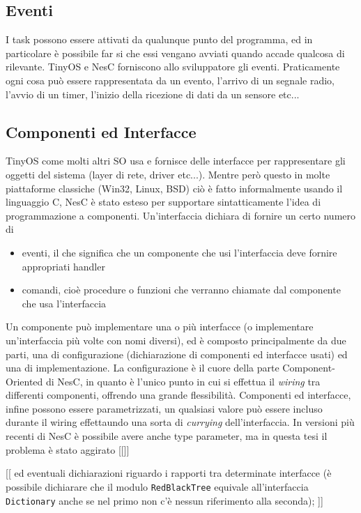\documentclass[pdftex,12pt,a4paper,italian,openany]{book}
\begin{document}
\subsection{Eventi}
I task possono essere attivati da qualunque punto del programma, ed in particolare è possibile 
far si che essi vengano avviati quando accade qualcosa di rilevante. 
TinyOS e NesC forniscono allo sviluppatore gli eventi. Praticamente ogni cosa può essere 
rappresentata da un evento, l'arrivo di un segnale radio, l'avvio di un timer, l'inizio della ricezione di dati da un sensore etc...
 

\subsection{Componenti ed Interfacce}
TinyOS come molti altri SO usa e fornisce delle interfacce per rappresentare gli oggetti del 
sistema (layer di rete, driver etc...). 
Mentre però questo in molte piattaforme classiche (Win32, Linux, BSD) ciò è fatto informalmente 
usando il linguaggio C, NesC è stato esteso per supportare sintatticamente l'idea di 
programmazione a componenti. 
Un'interfaccia dichiara di fornire un certo numero di 
\begin{itemize}

\item{eventi, il che significa che un componente che usi l'interfaccia deve fornire appropriati
handler} 

\item{comandi, cioè procedure o funzioni che verranno chiamate dal componente che usa l'interfaccia}
\end{itemize}

Un componente può implementare una o più interfacce (o implementare un'interfaccia più volte 
con nomi diversi), ed è composto principalmente da due parti, una di configurazione 
(dichiarazione di componenti ed interfacce usati) ed una di implementazione.
La configurazione è il cuore della parte Component-Oriented di NesC, in quanto è l'unico punto 
in cui si effettua il \emph{wiring} tra differenti componenti, offrendo una grande flessibilità.
Componenti ed interfacce, infine possono essere parametrizzati, un qualsiasi valore può essere 
incluso durante il wiring effettaundo una sorta di \emph{currying} dell'interfaccia. 
In versioni più recenti di NesC è possibile avere anche type parameter, ma in questa tesi  
il problema è stato aggirato [[]]


[[ ed eventuali dichiarazioni 
riguardo i rapporti tra determinate interfacce (è possibile dichiarare che il modulo 
\texttt{RedBlackTree} equivale all'interfaccia \texttt{Dictionary} anche se nel primo non 
c'è nessun  riferimento alla seconda);  ]]
\end{document}
